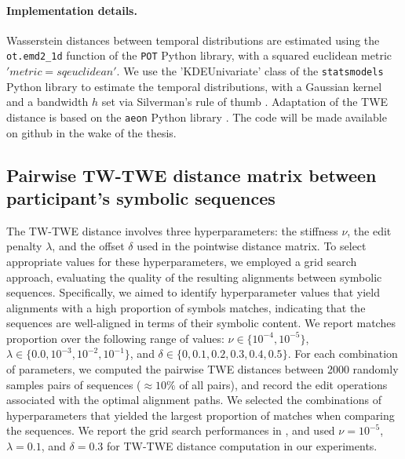 \begin{chapterabstract}
        \paragraph{Implementation details.\\}
            Wasserstein distances between temporal distributions are estimated using the \texttt{ot.emd2\_1d} function of the \texttt{POT} Python library, with a squared euclidean metric $'metric=sqeuclidean'$. We use the 'KDEUnivariate' class of the \texttt{statsmodels} Python library to estimate the temporal distributions, with a Gaussian kernel and a bandwidth $h$ set via Silverman's rule of thumb \cite{silverman1986density}. Adaptation of the TWE distance is based on the \texttt{aeon} Python library \cite{aeon_library}. The code will be made available on github in the wake of the thesis. 
                    
            
    \subsection{Pairwise TW-TWE distance matrix between participant's symbolic sequences}
    \label{sec:chapter_6_wasserstein_distance_matrices}

        The TW-TWE distance involves three hyperparameters: the stiffness $\nu$, the edit penalty $\lambda$, and the offset $\delta$ used in the pointwise distance matrix. To select appropriate values for these hyperparameters, we employed a grid search approach, evaluating the quality of the resulting alignments between symbolic sequences.  Specifically, we aimed to identify hyperparameter values that yield alignments with a high proportion of symbols matches, indicating that the sequences are well-aligned in terms of their symbolic content. We report matches proportion over the following range of values: $\nu \in \{10^{-4}, 10^{-5}\}$, $\lambda \in \{0.0, 10^{-3}, 10^{-2}, 10^{-1}\}$, and $\delta \in \{0, 0.1, 0.2, 0.3, 0.4, 0.5\}$. For each combination of parameters, we computed the pairwise TWE distances between 2000 randomly samples pairs of sequences ($\approx 10\%$ of all pairs), and record the edit operations associated with the optimal alignment paths. We selected the combinations of hyperparameters that yielded the largest proportion of matches when comparing the sequences. We report the grid search performances in , and used $\nu=10^{-5}$, $\lambda=0.1$, and $\delta=0.3$ for TW-TWE distance computation in our experiments.


\end{chapterabstract}
